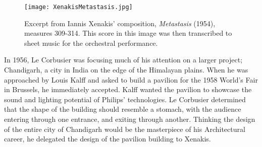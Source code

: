 \begin{figure*}[h]
  \texttt{[image: XenakisMetastasis.jpg]}
  \caption{Excerpt from Iannis Xenakis' composition,
    \textit{Metastasis} (1954), measures 309-314. This score in this
    image was then transcribed to sheet music for the orchestral
    performance.}
  \label{fig:metastasis}
\end{figure*}

In 1956, Le Corbusier was focusing much of his attention on a larger
project; Chandigarh, a city in India on the edge of the Himalayan
plains. When he was approached by Louis Kalff and asked to build a
pavilion for the 1958 World's Fair in Brussels, he immediately
accepted. Kalff wanted the pavilion to showcase the sound and lighting
potential of Philips' technologies. Le Corbusier determined that
the shape of the building should resemble a stomach, with the audience
entering through one entrance, and exiting through another. Thinking
the design of the entire city of Chandigarh would be the masterpiece
of his Architectural career,\cite{Flint2013} he delegated the design
of the pavilion building to Xenakis.\cite{Clarke2012}

